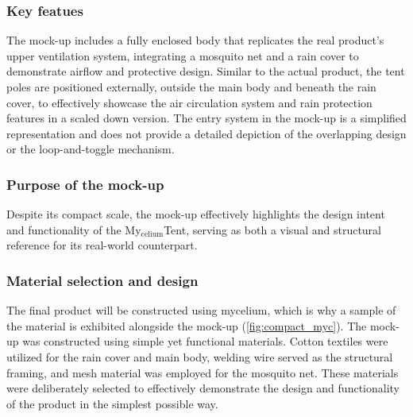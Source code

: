 \documentclass{article}
\newcommand{\myc}{My$_{\text{celium}}$Tent}
\begin{document}
\subsubsection{Key featues}
The mock-up includes a fully enclosed body that replicates the real product’s upper
ventilation system, integrating a mosquito net and a rain cover to demonstrate airflow
and protective design. Similar to the actual product, the tent poles are positioned
externally, outside the main body and beneath the rain cover, to effectively showcase the
air circulation system and rain protection features in a scaled down version. The entry
system in the mock-up is a simplified representation and does not provide a detailed
depiction of the overlapping design or the loop-and-toggle mechanism.

\subsubsection{Purpose of the mock-up}
Despite its compact scale, the mock-up effectively highlights the design intent and
functionality of the \myc, serving as both a visual and structural reference for
its real-world counterpart.

\subsubsection{Material selection and design}
The final product will be constructed using mycelium, which is why a sample of the material
is exhibited alongside the mock-up (\autoref{fig:compact_myc}). The mock-up was constructed
using simple yet functional materials. Cotton textiles were utilized for the rain cover and
main body, welding wire served as the structural framing, and mesh material was employed
for the mosquito net. These materials were deliberately selected to effectively demonstrate
the design and functionality of the product in the simplest possible way.
\end{document}
